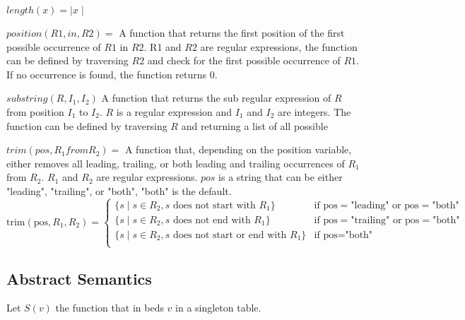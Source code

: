 $length(x) = \mid x \mid $

$position(R1, in, R2) =$ A function that returns the first position of the first possible occurrence of $R1$ in $R2$.
R1 and $R2$ are regular expressions, the function can be defined by traversing $R2$ and check for the first possible occurrence of $R1$. If no occurrence is found, the function returns $0$.

$substring(R, I_1, I_2)$ A function that returns the sub regular expression of $R$ from position $I_1$ to $I_2$.
$R$ is a regular expression and $I_1$ and $I_2$ are integers. The function can be defined by traversing $R$ and returning a list of all possible


$trim(pos, R_1 from R_2) =$ A function that, depending on the position variable, either removes all leading, trailing, or both leading and trailing occurrences of $R_1$ from $R_2$.
$R_1$ and $R_2$ are regular expressions. $pos$ is a string that can be either "leading", "trailing", or "both", "both" is the default.
\[
    \text{trim}(\text{pos}, R_1, R_2) =
    \begin{cases}
        \{ s \mid s \in R_2, s \text{ does not start with } R_1 \}        & \text{if } \text{pos} = \text{"leading"} \text{ or } \text{pos} = \text{"both"}  \\
        \{ s \mid s \in R_2, s \text{ does not end with } R_1 \}          & \text{if } \text{pos} = \text{"trailing"} \text{ or } \text{pos} = \text{"both"} \\
        \{ s \mid s \in R_2, s \text{ does not start or end with } R_1 \} & \text{if } \text{pos} = \text{"both"}                                            \\
    \end{cases}
\]


\subsection{Abstract Semantics}

Let $S(v)$ the function that in beds $v$ in a singleton table.



